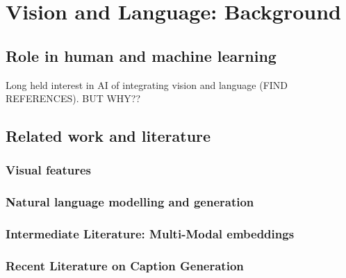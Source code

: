 \chapter{Vision and Language: Background} \label{chapter:background} 

\section{Role in human and machine learning}
Long held interest in AI of integrating vision and language (FIND REFERENCES). BUT WHY?? 
\section{Related work and literature}
\subsection{Visual features}
\label{chapter2:visFeat}
\subsection{Natural language modelling and generation}
\subsection{Intermediate Literature: Multi-Modal embeddings}
\subsection{Recent Literature on Caption Generation}
